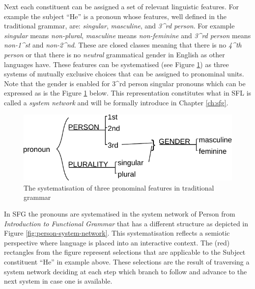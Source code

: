 Next each constituent can be assigned a set of relevant linguistic features. For example the subject ``He'' is a pronoun whose features, well defined in the traditional grammar, are: \textit{singular}, \textit{masculine}, and \textit{3^{rd} person}. %
For example \textit{singular} means \textit{non-plural}, \textit{masculine} means \textit{non-feminine} and \textit{3^{rd} person} means \textit{non-1^{st}} and \textit{non-2^{nd}}. These are closed classes meaning that there is no \textit{4^{th} person} or that there is no \textit{neutral} grammatical gender in English as other languages have. These features can be systematised (see Figure \ref{fig:traditional-pronoun}) as three systems of mutually exclusive choices that can be assigned to pronominal units. Note that the gender is enabled for 3^{rd} person singular pronouns which can be expressed as is the Figure \ref{fig:traditional-pronoun} below. This representation constitutes what in SFL is called a \textit{system network} and will be formally introduce in Chapter \ref{ch:sfg}.

\begin{figure}[!ht]
    \centering      
    \includegraphics[width=.56\textwidth]{Figures/Example/traditional-pronoun.pdf}      
    \caption{The systematisation of three pronominal features in traditional grammar}
    \label{fig:traditional-pronoun}
\end{figure}

In SFG the pronouns are systematised in the system network of Person from \textit{Introduction to Functional Grammar} \citep[366]{Halliday2013} that has a different structure as depicted in Figure \ref{fig:person-system-network}. This systematisation reflects a semiotic perspective where language is placed into an interactive context. The (red) rectangles from the figure represent selections that are applicable to the Subject constituent ``He'' in example above. These selections are the result of traversing a system network deciding at each step which branch to follow and advance to the next system in case one is available. 

